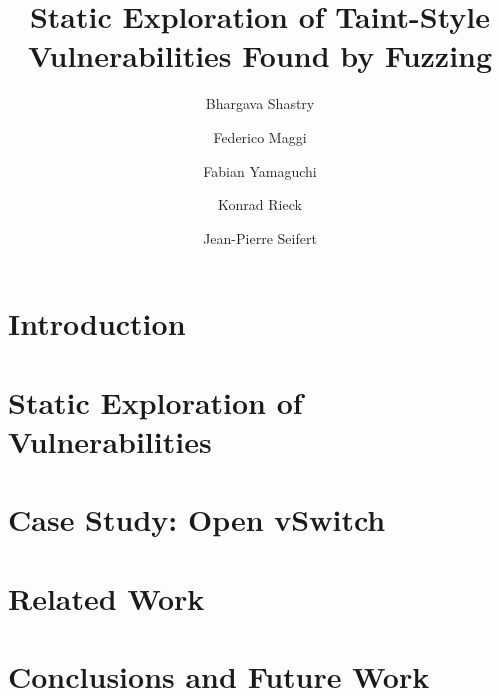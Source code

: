 \documentclass[letterpaper,twocolumn,10pt]{article}
\begin{document}
\title{Static Exploration of Taint-Style Vulnerabilities Found by Fuzzing}

\author[1]{Bhargava Shastry}
\author[2]{Federico Maggi}
\author[3]{Fabian Yamaguchi}
\author[3]{Konrad Rieck}
\author[1]{Jean-Pierre Seifert}

\renewcommand\Authands{ and }

\maketitle


\begin{abstract}

\end{abstract}

\section{Introduction}
\label{sec:intro}


\section{Static Exploration of Vulnerabilities}
\label{sec:method}


\section{Case Study: Open vSwitch}
\label{sec:results}


\section{Related Work}
\label{sec:literature}


\section{Conclusions and Future Work}
\label{sec:conclusion}





\end{document}
